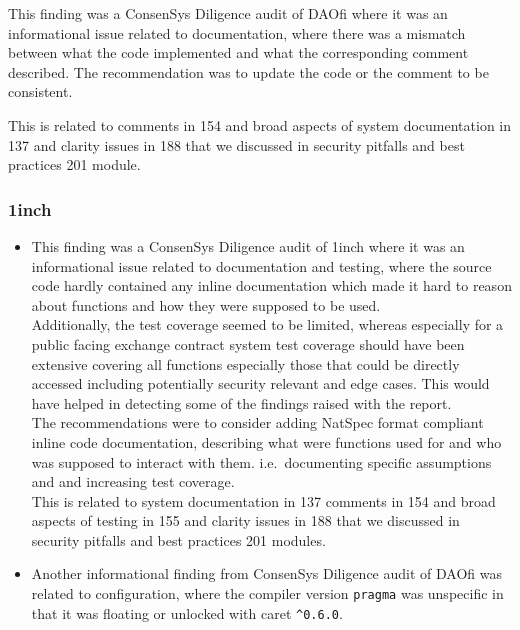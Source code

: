 This finding was a ConsenSys Diligence audit of DAOfi where it was an
informational issue related to documentation, where there was a mismatch
between what the code implemented and what the corresponding comment
described. The recommendation was to update the code or the comment to
be consistent.

This is related to comments in 154 and broad aspects of system
documentation in 137 and clarity issues in 188 that we discussed in
security pitfalls and best practices 201 module.

\subsubsection{1inch}\label{inch}

\begin{itemize}
\item
  This finding was a ConsenSys Diligence audit of 1inch where it was an
  informational issue related to documentation and testing, where the
  source code hardly contained any inline documentation which made it
  hard to reason about functions and how they were supposed to be
  used.\\

  Additionally, the test coverage seemed to be limited, whereas
  especially for a public facing exchange contract system test coverage
  should have been extensive covering all functions especially those
  that could be directly accessed including potentially security
  relevant and edge cases. This would have helped in detecting some of
  the findings raised with the report.\\

  The recommendations were to consider adding NatSpec format compliant
  inline code documentation, describing what were functions used for and
  who was supposed to interact with them. i.e.~documenting specific
  assumptions and and increasing test coverage.\\

  This is related to system documentation in 137 comments in 154 and
  broad aspects of testing in 155 and clarity issues in 188 that we
  discussed in security pitfalls and best practices 201 modules.
\item
  Another informational finding from ConsenSys Diligence audit of DAOfi
  was related to configuration, where the compiler version
  \texttt{pragma} was unspecific in that it was floating or unlocked
  with caret \texttt{\^{}0.6.0}.\\


\end{itemize}
